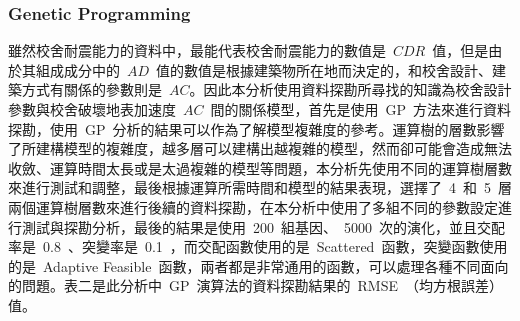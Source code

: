 \subsubsection{Genetic Programming}

雖然校舍耐震能力的資料中，最能代表校舍耐震能力的數值是~$CDR$~值，但是由於其組成成分中的~$AD$~值的數值是根據建築物所在地而決定的，和校舍設計、建築方式有關係的參數則是~$AC$。因此本分析使用資料探勘所尋找的知識為校舍設計參數與校舍破壞地表加速度~$AC$~間的關係模型，首先是使用~GP~方法來進行資料探勘，使用~GP~分析的結果可以作為了解模型複雜度的參考。運算樹的層數影響了所建構模型的複雜度，越多層可以建構出越複雜的模型，然而卻可能會造成無法收斂、運算時間太長或是太過複雜的模型等問題，本分析先使用不同的運算樹層數來進行測試和調整，最後根據運算所需時間和模型的結果表現，選擇了~4~和~5~層兩個運算樹層數來進行後續的資料探勘，在本分析中使用了多組不同的參數設定進行測試與探勘分析，最後的結果是使用~200~組基因、~5000~次的演化，並且交配率是~0.8~、突變率是~0.1~，而交配函數使用的是~Scattered~函數，突變函數使用的是~Adaptive Feasible~函數，兩者都是非常通用的函數，可以處理各種不同面向的問題。表二是此分析中~GP~演算法的資料探勘結果的~RMSE~（均方根誤差）值。


